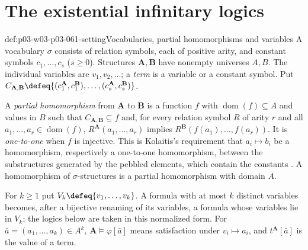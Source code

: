 \section{The existential infinitary logics}
\label{sec:p03-w03-p03-061-logics}

\begin{hbconvention}{def:p03-w03-p03-061-setting}{Vocabularies, partial homomorphisms and variables}
A vocabulary \(\sigma\) consists of relation symbols, each of positive arity,
and constant symbols \(c_1,\ldots,c_s\) (\(s\ge0\)). Structures
\(\mathbf A,\mathbf B\) have nonempty universes \(A,B\). The individual
variables are \(v_1,v_2,\ldots\); a \emph{term} is a variable or a constant
symbol. Put
\(C_{\mathbf A,\mathbf B}\defeq\{(c_1^{\mathbf A},c_1^{\mathbf B}),\ldots,
(c_s^{\mathbf A},c_s^{\mathbf B})\}\).

A \emph{partial homomorphism} from \(\mathbf A\) to \(\mathbf B\) is a
function \(f\) with \(\operatorname{dom}(f)\subseteq A\) and values in
\(B\) such that \(C_{\mathbf A,\mathbf B}\subseteq f\) and, for every
relation symbol \(R\) of arity \(r\) and all
\(a_1,\ldots,a_r\in\operatorname{dom}(f)\),
\(R^{\mathbf A}(a_1,\ldots,a_r)\) implies
\(R^{\mathbf B}(f(a_1),\ldots,f(a_r))\). It is \emph{one-to-one} when \(f\)
is injective. This is Kolaitis's requirement that \(a_i\mapsto b_i\) be a
homomorphism, respectively a one-to-one homomorphism, between the
substructures generated by the pebbled elements, which contain the constants
\cite[pp.~71--72]{Kolaitis2003ExpressivePowerNotes}. A homomorphism of
\(\sigma\)-structures is a partial homomorphism with domain \(A\).

For \(k\ge1\) put \(V_k\defeq\{v_1,\ldots,v_k\}\). A formula with at most
\(k\) distinct variables becomes, after a bijective renaming of its
variables, a formula whose variables lie in \(V_k\); the logics below are
taken in this normalized form. For \(\bar a=(a_1,\ldots,a_k)\in A^k\),
\(\mathbf A\models\varphi[\bar a]\) means satisfaction under
\(v_i\mapsto a_i\), and \(t^{\mathbf A}[\bar a]\) is the value of a term.
\end{hbconvention}

